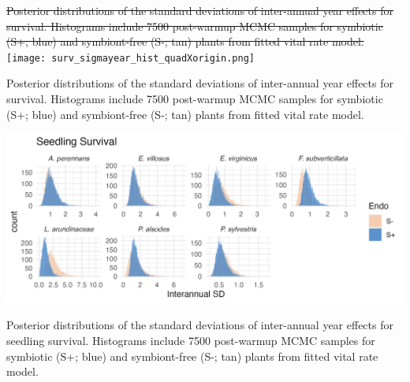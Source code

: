 \documentclass[lineno, sn-basic]{sn-jnl}%
\providecommand{\DIFadd}[1]{{\protect\color{blue}#1}} %
\providecommand{\DIFdel}[1]{{\protect\color{red}\protect\scriptsize\sout{#1}}}
\providecommand{\DIFadd}[1]{{\protect\color{blue}\uwave{#1}}} %
\providecommand{\DIFdel}[1]{{\protect\color{red}\sout{#1}}}                      %
\providecommand{\DIFaddbegin}{} %
\providecommand{\DIFaddend}{} %
\providecommand{\DIFdelbegin}{} %
\providecommand{\DIFdelend}{} %
\providecommand{\DIFdelFL}[1]{\DIFdel{#1}} %
\providecommand{\DIFaddbeginFL}{} %
\providecommand{\DIFaddendFL}{} %
\providecommand{\DIFdelbeginFL}{} %
\providecommand{\DIFdelendFL}{} %
\newcommand{\DIFscaledelfig}{0.5}
\newlength{\DIFdelgraphicswidth} %
\newlength{\DIFdelgraphicsheight} %
\newcommand{\DIFaddincludegraphics}[2][]{{\color{blue}\fbox{\DIFOincludegraphics[#1]{#2}}}} %
\newcommand{\DIFdelincludegraphics}[2][]{%
\sbox{\DIFdelgraphicsbox}{\DIFOincludegraphics[#1]{#2}}%
\settoboxwidth{\DIFdelgraphicswidth}{\DIFdelgraphicsbox} %
\settoboxtotalheight{\DIFdelgraphicsheight}{\DIFdelgraphicsbox} %
\scalebox{\DIFscaledelfig}{%
\parbox[b]{\DIFdelgraphicswidth}{\usebox{\DIFdelgraphicsbox}\\[-\baselineskip] \rule{\DIFdelgraphicswidth}{0em}}\llap{\resizebox{\DIFdelgraphicswidth}{\DIFdelgraphicsheight}{%
\setlength{\unitlength}{\DIFdelgraphicswidth}%
\begin{picture}(1,1)%
\thicklines\linethickness{2pt} %
{\color[rgb]{1,0,0}\put(0,0){\framebox(1,1){}}}%
{\color[rgb]{1,0,0}\put(0,0){\line( 1,1){1}}}%
{\color[rgb]{1,0,0}\put(0,1){\line(1,-1){1}}}%
\end{picture}%
}\hspace*{3pt}}} %
} %
\DeclareRobustCommand{\DIFaddbegin}{\DIFOaddbegin \let\includegraphics\DIFaddincludegraphics} %
\DeclareRobustCommand{\DIFaddend}{\DIFOaddend \let\includegraphics\DIFOincludegraphics} %
\DeclareRobustCommand{\DIFdelbegin}{\DIFOdelbegin \let\includegraphics\DIFdelincludegraphics} %
\DeclareRobustCommand{\DIFdelend}{\DIFOaddend \let\includegraphics\DIFOincludegraphics} %
\DeclareRobustCommand{\DIFaddbeginFL}{\DIFOaddbeginFL \let\includegraphics\DIFaddincludegraphics} %
\DeclareRobustCommand{\DIFaddendFL}{\DIFOaddendFL \let\includegraphics\DIFOincludegraphics} %
\DeclareRobustCommand{\DIFdelbeginFL}{\DIFOdelbeginFL \let\includegraphics\DIFdelincludegraphics} %
\DeclareRobustCommand{\DIFdelendFL}{\DIFOaddendFL \let\includegraphics\DIFOincludegraphics} %
\begin{document}
\DIFdelbegin %
\DIFdelendFL \DIFaddbeginFL \begin{myfigure}[H]
	\DIFaddendFL \centering
	\DIFdelbeginFL %
\DIFdelFL{Posterior distributions of the standard deviations of inter-annual year effects for survival. Histograms include 7500 post-warmup MCMC samples for symbiotic (S+; blue) and symbiont-free (S-; tan) plants from fitted vital rate model.}%
\DIFdelend \DIFaddbegin \texttt{[image: surv\_sigmayear\_hist\_quadXorigin.png]}
	\caption[Posterior distributions of the standard deviations of inter-annual year effects for survival]{\DIFadd{Posterior distributions of the standard deviations of inter-annual year effects for survival. Histograms include 7500 post-warmup MCMC samples for symbiotic (S+; blue) and symbiont-free (S-; tan) plants from fitted vital rate model.}}
\end{myfigure}
\DIFaddend 


\DIFdelbegin %
\DIFdelendFL \DIFaddbeginFL \begin{myfigure}[H]
	\DIFaddendFL \centering
	\includegraphics[width=.9\linewidth]{seedsurv_sigmayear_hist.png}
	\DIFdelbeginFL %
\DIFdelendFL \DIFaddbeginFL \caption[Posterior distributions of the standard deviations of inter-annual year effects for seedling survival]{\DIFaddendFL Posterior distributions of the standard deviations of inter-annual year effects for seedling survival. Histograms include 7500 post-warmup MCMC samples for symbiotic (S+; blue) and symbiont-free (S-; tan) plants from fitted vital rate model.}
\DIFdelbeginFL %
\DIFdelend \DIFaddbegin \end{myfigure}
\DIFaddend 
\end{document}
